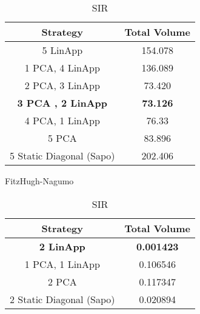 \begin{table}[h!]
  \hspace{1em}
  \begin{subtable}[h]{0.45\textwidth}
       \centering
       \begin{tabular}{|c|c|}
       \hline
       Strategy & Total  Volume \\
       \hline
       5 LinApp  & 154.078\\
       \hline
       1 PCA, 4 LinApp  & 136.089\\
       \hline
       2 PCA, 3 LinApp  & 73.420\\
       \hline
       {\bf 3 PCA , 2 LinApp } & {\bf 73.126} \\
       \hline
       4 PCA, 1 LinApp  & 76.33 \\
       \hline
       5 PCA & 83.896 \\
       \hline
       5 Static Diagonal  (Sapo) & 202.406  \\
       \hline
      \end{tabular}
      \caption{FitzHugh-Nagumo}
      \end{subtable} \hspace{1em}
      \begin{subtable}[h]{0.45\textwidth}
        \centering
        \begin{tabular}{|c|c|}
        \hline
        Strategy & Total  Volume \\
        \hline
        {\bf 2 LinApp } & {\bf 0.001423} \\
        \hline
        1 PCA, 1 LinApp & 0.106546\\

        \hline
        2 PCA  & 0.117347\\
        \hline
        2 Static Diagonal (Sapo) & 0.020894\\
        \hline
       \end{tabular}
       \caption{SIR}
       \label{tab:sirvol}
    \end{subtable}


\end{table}
